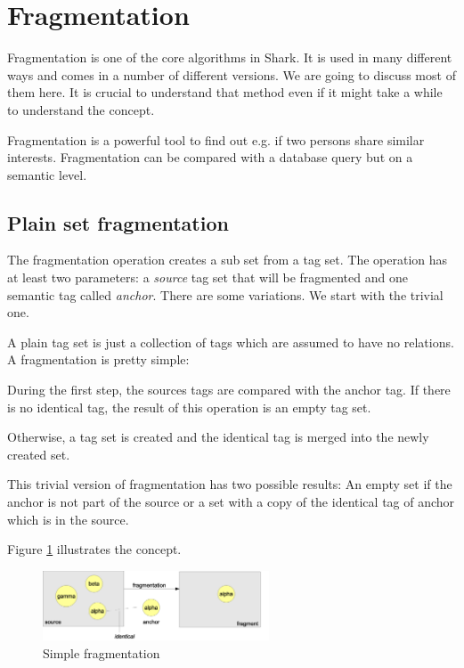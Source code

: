 \section{Fragmentation}
Fragmentation is one of the core algorithms in Shark. It is used in many different ways and comes in a number of different versions. We are going to discuss most of them here. It is crucial to understand that method even if it might take a while to understand the concept.

Fragmentation is a powerful tool to find out e.g. if two persons share similar interests. Fragmentation can be compared with a database query but on a semantic level.

\subsection{Plain set fragmentation}
The fragmentation operation creates a sub set from a tag set. The operation has at least two parameters: a {\it source} tag set that will be fragmented and one semantic tag called {\it anchor}. There are some variations. We start with the trivial one.

A plain tag set is just a collection of tags which are assumed to have no relations. A fragmentation is pretty simple:

During the first step, the sources tags are compared with the anchor tag. If there is no identical tag, the result of this operation is an empty tag set.

Otherwise, a tag set is created and the identical tag is merged into the newly created set.

This trivial version of fragmentation has two possible results: An empty set if the anchor is not part of the source or a set with a copy of the identical tag of anchor which is in the source.

Figure \ref{fig:simpleFragmentation} illustrates the concept.

\begin{figure}[t]
\centering
\includegraphics[width=0.60\textwidth]{simpleFragmentation.eps}
\caption{Simple fragmentation}
\label{fig:simpleFragmentation}
\end{figure}


